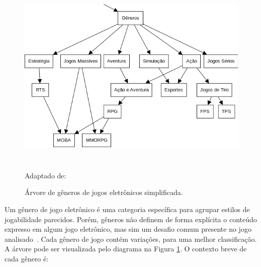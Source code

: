 \begin{figure}[htb!]
\caption{Árvore de gêneros de jogos eletrônicos simplificada.}
\label{fig:generos}
\includegraphics[height=9cm]{img/cap2/generos.png}
\centering

Adaptado de:~\cite{adams_1208533}
\end{figure}



Um gênero de jogo eletrônico é uma categoria específica para agrupar estilos de jogabilidade parecidos.
%
Porém, gêneros não definem de forma explícita o conteúdo expresso em algum jogo eletrônico, mas sim um desafio comum presente no jogo analisado~\cite{adams_1208533, video_game_technologies}.
%
Cada gênero de jogo contém variações, para uma melhor classificação.
%
A árvore pode ser visualizada pelo diagrama na Figura \ref{fig:generos}.
%
O contexto breve de cada gênero é:



